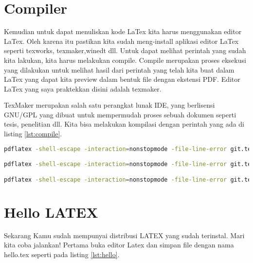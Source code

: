 \section{Compiler}
Kemudian untuk dapat menuliskan kode LaTex kita harus menggunakan editor LaTex. Oleh karena itu pastikan kita sudah meng-install aplikasi editor LaTex seperti texworks, texmaker,winedt dll. Untuk dapat melihat perintah yang sudah kita lakukan, kita harus melakukan compile. Compile merupakan proses eksekusi yang dilakukan untuk melihat hasil dari perintah yang telah kita buat dalam LaTex yang dapat kita preview dalam bentuk file dengan ekstensi PDF. Editor LaTex yang saya praktekkan disini adalah texmaker.


TexMaker merupakan salah satu perangkat lunak IDE, yang berlisensi GNU/GPL yang dibuat untuk mempermudah proses sebuah dokumen seperti tesis, penelitian dll. Kita bisa melakukan kompilasi dengan perintah yang ada di listing \ref{lst:compile}.

\begin{lstlisting}[caption=Perintah kompilasi latex keluaran pdf,label={lst:compile},language=sh]
pdflatex -shell-escape -interaction=nonstopmode -file-line-error git.tex | grep ".*:[0-9]*:.*|LaTeX Warning:"

pdflatex -shell-escape -interaction=nonstopmode -file-line-error git.tex | grep ".*:[0-9]*:.*"

pdflatex -shell-escape -interaction=nonstopmode -file-line-error git.tex | grep -i ".*:[0-9]*:.*\|warning"
\end{lstlisting} 

\section{Hello LATEX}
Sekarang Kamu sudah mempunyai distribusi LATEX yang sudah terinstal. Mari kita coba jalankan! Pertama buka editor Latex dan simpan file dengan nama hello.tex seperti pada listing \ref{lst:hello}.
\cite{kline2018latex}
